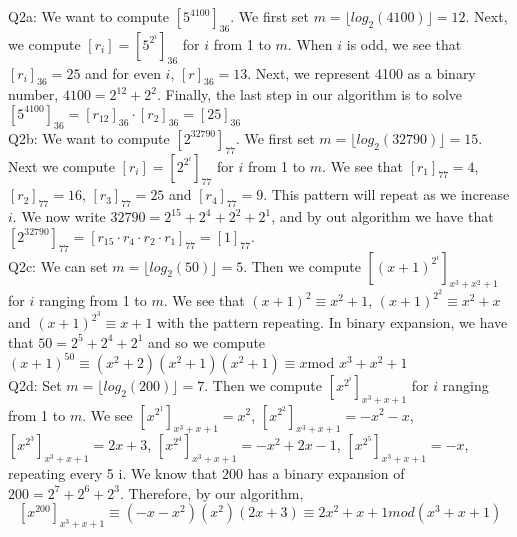 \documentclass[letterpaper]{article}
\begin{document}
\noindent Q2a: We want to compute $[5^{4100}]_{36}$. We first set $m = \lfloor log_2(4100) \rfloor = 12$. Next, we compute $[r_i] = [5^{2^i}]_{36}$ for $i$ from 1 to $m$. When $i$ is odd, we see that $[r_i]_{36}=25$ and for even $i$, $[r]_{36}=13$. Next, we represent 4100 as a binary number, $4100 =2^{12}+2^2$. Finally, the last step in our algorithm is to solve $[5^{4100}]_{36} = [r_{12}]_{36}\cdot [r_2]_{36} = [25]_{36}$
\newline \\ Q2b: We want to compute $[2^{32790}]_{77}$. We first set $m=\lfloor log_2(32790) \rfloor = 15$. Next we compute $[r_i] = [2^{2^i}]_{77}$ for $i$ from 1 to $m$. We see that $[r_1]_{77}=4$, $[r_2]_{77}=16$, $[r_3]_{77} = 25$ and $[r_4]_{77}=9$. This pattern will repeat as we increase $i$. We now write $32790 = 2^{15} + 2^4 + 2^2 + 2^1$, and by out algorithm we have that $[2^{32790}]_{77} = [r_{15}\cdot r_4 \cdot r_2 \cdot r_1]_{77} = [1]_{77}$. 
\newline \\ Q2c: We can set $m = \lfloor log_2(50) \rfloor = 5$. Then we compute $[(x+1)^{2^i}]_{x^3+x^2+1}$ for $i$ ranging from 1 to $m$. We see that $(x+1)^2\equiv x^2+1$, $(x+1)^{2^2} \equiv x^2+x$ and $(x+1)^{2^3}\equiv x+1$ with the pattern repeating. In binary expansion, we have that $50=2^5+2^4+2^1$ and so we compute $(x+1)^{50}\equiv (x^2+2)(x^2+1)(x^2+1) \equiv x $mod $x^3+x^2+1$
\newline \\ Q2d: Set $m= \lfloor log_2(200) \rfloor = 7$. Then we compute $[x^{2^i}]_{x^3+x+1}$ for $i$ ranging from 1 to $m$. We see $[x^{2^1}]_{x^3+x+1}=x^2$, $[x^{2^2}]_{x^3+x+1}=-x^2-x$, $[x^{2^3}]_{x^3+x+1} = 2x+3$, $[x^{2^4}]_{x^3+x+1}=-x^2+2x-1$, $[x^{2^5}]_{x^3+x+1}=-x$, repeating every 5 i. We know that $200$ has a binary expansion of $200=2^7+2^6+2^3$. Therefore, by our algorithm, $$[x^{200}]_{x^3+x+1} \equiv(-x-x^2)(x^2)(2x+3)\equiv 2x^2+x+1 mod(x^3+x+1)$$
\end{document}
